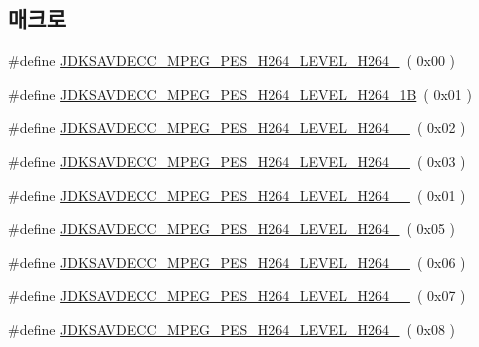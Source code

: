 \subsection*{매크로}
\begin{DoxyCompactItemize}
\item 
\#define \hyperlink{group__mpeg__pes__h264__level_ga39ead86c37aa3d7a358b7625a8ee2458}{J\+D\+K\+S\+A\+V\+D\+E\+C\+C\+\_\+\+M\+P\+E\+G\+\_\+\+P\+E\+S\+\_\+\+H264\+\_\+\+L\+E\+V\+E\+L\+\_\+\+H264\+\_}~( 0x00 )
\item 
\#define \hyperlink{group__mpeg__pes__h264__level_gae8773d88607048cbe0f599502dda4b16}{J\+D\+K\+S\+A\+V\+D\+E\+C\+C\+\_\+\+M\+P\+E\+G\+\_\+\+P\+E\+S\+\_\+\+H264\+\_\+\+L\+E\+V\+E\+L\+\_\+\+H264\+\_\+1B}~( 0x01 )
\item 
\#define \hyperlink{group__mpeg__pes__h264__level_ga25eecad71883dda60aae480cb3ae318b}{J\+D\+K\+S\+A\+V\+D\+E\+C\+C\+\_\+\+M\+P\+E\+G\+\_\+\+P\+E\+S\+\_\+\+H264\+\_\+\+L\+E\+V\+E\+L\+\_\+\+H264\+\_\+\_}~( 0x02 )
\item 
\#define \hyperlink{group__mpeg__pes__h264__level_gab4dcee9c2b58be14c62209a01d47629d}{J\+D\+K\+S\+A\+V\+D\+E\+C\+C\+\_\+\+M\+P\+E\+G\+\_\+\+P\+E\+S\+\_\+\+H264\+\_\+\+L\+E\+V\+E\+L\+\_\+\+H264\+\_\+\_}~( 0x03 )
\item 
\#define \hyperlink{group__mpeg__pes__h264__level_ga2e1743dd2daa578dd7f04dde368f8d04}{J\+D\+K\+S\+A\+V\+D\+E\+C\+C\+\_\+\+M\+P\+E\+G\+\_\+\+P\+E\+S\+\_\+\+H264\+\_\+\+L\+E\+V\+E\+L\+\_\+\+H264\+\_\+\_}~( 0x01 )
\item 
\#define \hyperlink{group__mpeg__pes__h264__level_ga60dad981c17e7ffa475eed77f9c5e7dc}{J\+D\+K\+S\+A\+V\+D\+E\+C\+C\+\_\+\+M\+P\+E\+G\+\_\+\+P\+E\+S\+\_\+\+H264\+\_\+\+L\+E\+V\+E\+L\+\_\+\+H264\+\_}~( 0x05 )
\item 
\#define \hyperlink{group__mpeg__pes__h264__level_ga800278d2dd2baf9cc136a615539bacc9}{J\+D\+K\+S\+A\+V\+D\+E\+C\+C\+\_\+\+M\+P\+E\+G\+\_\+\+P\+E\+S\+\_\+\+H264\+\_\+\+L\+E\+V\+E\+L\+\_\+\+H264\+\_\+\_}~( 0x06 )
\item 
\#define \hyperlink{group__mpeg__pes__h264__level_gac550ae66217b5f3cd02134de8940e4ce}{J\+D\+K\+S\+A\+V\+D\+E\+C\+C\+\_\+\+M\+P\+E\+G\+\_\+\+P\+E\+S\+\_\+\+H264\+\_\+\+L\+E\+V\+E\+L\+\_\+\+H264\+\_\+\_}~( 0x07 )
\item 
\#define \hyperlink{group__mpeg__pes__h264__level_ga119450bb23bfe2afb343015939c2f432}{J\+D\+K\+S\+A\+V\+D\+E\+C\+C\+\_\+\+M\+P\+E\+G\+\_\+\+P\+E\+S\+\_\+\+H264\+\_\+\+L\+E\+V\+E\+L\+\_\+\+H264\+\_}~( 0x08 )
\item 

\end{DoxyCompactItemize}
